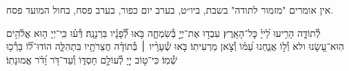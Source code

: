 \documentclass[twoside, openany, parskip=half, 11pt]{book}
\begin{document}
\begin{narrow}
\begin{scriptsize} %
\textsf{
אין אומרים "מזמור לתודה" בשבת, ביו״ט, בערב יום כפור, בערב פסח, בחול המועד פסח.\\
}\end{scriptsize}
 לְ֯תוֹדָ֑ה
הָרִ֥יעוּ לַ֝ייָ֗ כׇּל־הָאָֽרֶץ׃
עִבְד֣וּ אֶת־יְיָ֣ בְּ֯שִׂמְחָ֑ה בֹּ֥אוּ לְ֯֝פָנָ֗יו בִּרְנָנָֽה׃
דְּ֯ע֗וּ כִּֽי־יְיָ ה֤וּא אֱלֹ֫הִ֥ים הֽוּא־עָ֭שָׂנוּ ולא וְ֯ל֣וֹ אֲנַ֑חְנוּ עַ֝מּ֗וֹ וְ֯צֹ֣אן מַרְעִיתֽוֹ׃
בֹּ֤אוּ שְׁ֯עָרָ֨יו ׀ בְּ֯תוֹדָ֗ה חֲצֵרֹתָ֥יו בִּתְהִלָּ֑ה הוֹדוּ־ל֗֝וֹ בָּרְ֯כ֥וּ שְׁ֯מֽוֹ׃
כִּי־ט֣וֹב יְיָ֭ לְ֯עוֹלָ֣ם חַסְדּ֑וֹ וְ֯עַד־דֹּ֥ר וָ֝דֹ֗ר אֱמוּנָתֽוֹ׃
\end{narrow}
\end{document}
